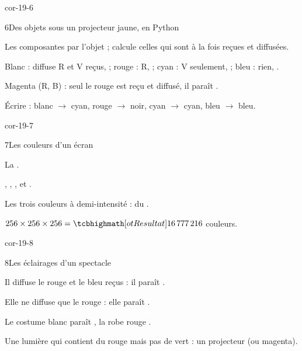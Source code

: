 \begin{blocLivre}{cor-19-6}
\begin{corrige}{6}{Des objets sous un projecteur jaune, en Python}
\begin{questions}
\item Les composantes  par l'objet ; \code{\&} calcule celles qui sont à la fois reçues et diffusées.
\item Blanc : diffuse R et V reçus,  ; rouge : R,  ; cyan : V seulement,  ; bleu : rien, .
\item Magenta (R, B) : seul le rouge est reçu et diffusé, il paraît .
\item Écrire  : blanc $\to$ cyan, rouge $\to$ noir, cyan $\to$ cyan, bleu $\to$ bleu.
\end{questions}
\end{corrige}
\end{blocLivre}
\begin{blocLivre}{cor-19-7}
\begin{corrige}{7}{Les couleurs d'un écran}
\begin{questions}
\item La .
\item {}, , ,  et .
\item Les trois couleurs à demi-intensité : du .
\item $256\times256\times256=\res{\num{16777216}}$ couleurs.
\end{questions}
\end{corrige}
\end{blocLivre}
\begin{blocLivre}{cor-19-8}
\begin{corrige}{8}{Les éclairages d'un spectacle}
\begin{questions}
\item Il diffuse le rouge et le bleu reçus : il paraît .
\item Elle ne diffuse que le rouge : elle paraît .
\item Le costume blanc paraît , la robe rouge .
\item Une lumière qui contient du rouge mais pas de vert : un projecteur  (ou magenta).
\end{questions}
\end{corrige}
\end{blocLivre}

